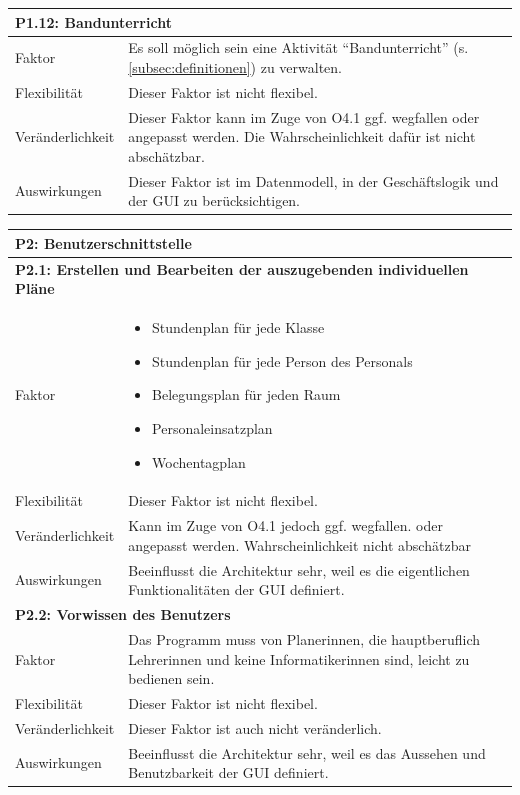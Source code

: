 \documentclass[fontsize=12pt,paper=a4,twoside]{scrartcl}
\begin{document}
\begin{tabularx}{\textwidth}{|l|X|}
\multicolumn{2}{|l|}{\textbf{P1.12: Bandunterricht}}\\\hline
Faktor & Es soll möglich sein eine Aktivität "`Bandunterricht"' (s. \ref{subsec:definitionen}) zu verwalten.\\\hline
Flexibilität & Dieser Faktor ist nicht flexibel.\\\hline
Veränderlichkeit & Dieser Faktor kann im Zuge von O4.1 ggf. wegfallen oder angepasst werden. Die Wahrscheinlichkeit dafür ist nicht abschätzbar.\\\hline
Auswirkungen & Dieser Faktor ist im Datenmodell, in der Geschäftslogik und der GUI zu berücksichtigen.\\\hline
\end{tabularx}

\newpage

\begin{tabularx}{\textwidth}{|l|X|}
\hline
\multicolumn{2}{|l|}{\textbf{P2: Benutzerschnittstelle}}\\\hline
\multicolumn{2}{|l|}{\textbf{P2.1: Erstellen und Bearbeiten der auszugebenden individuellen
 Pläne}}\\\hline
 Faktor & \begin{itemize}[topsep=0cm, leftmargin=0.5cm, itemsep=0pt]
 \item Stundenplan für jede Klasse
 \item Stundenplan für jede Person des Personals
 \item Belegungsplan für jeden Raum
 \item Personaleinsatzplan 
 \item Wochentagplan
 \end{itemize} \\\hline
 Flexibilität & Dieser Faktor ist nicht flexibel. \\\hline
 Veränderlichkeit & Kann im Zuge von O4.1 jedoch ggf. wegfallen. oder angepasst werden.  Wahrscheinlichkeit nicht abschätzbar \\\hline
 Auswirkungen & Beeinflusst die Architektur sehr, weil es die eigentlichen Funktionalitäten der GUI definiert.  \\\hline
\multicolumn{2}{|l|}{\textbf{P2.2: Vorwissen des Benutzers}}\\\hline
Faktor & Das Programm muss von Planerinnen, die hauptberuflich Lehrerinnen und keine Informatikerinnen sind, leicht zu bedienen sein. \\\hline
Flexibilität & Dieser Faktor ist nicht flexibel. \\\hline
Veränderlichkeit & Dieser Faktor ist auch nicht veränderlich. \\\hline
Auswirkungen & Beeinflusst die Architektur sehr, weil es das Aussehen und Benutzbarkeit der GUI definiert.  \\\hline
\end{tabularx}\\
\end{document}
